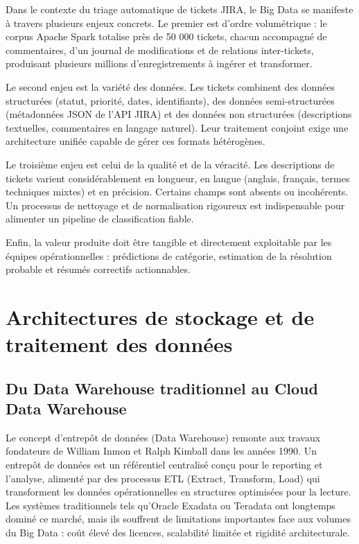 Dans le contexte du triage automatique de tickets JIRA, le Big Data se manifeste à travers plusieurs enjeux concrets. Le premier est d'ordre volumétrique : le corpus Apache Spark totalise près de 50 000 tickets, chacun accompagné de commentaires, d'un journal de modifications et de relations inter-tickets, produisant plusieurs millions d'enregistrements à ingérer et transformer.

Le second enjeu est la variété des données. Les tickets combinent des données structurées (statut, priorité, dates, identifiants), des données semi-structurées (métadonnées JSON de l'API JIRA) et des données non structurées (descriptions textuelles, commentaires en langage naturel). Leur traitement conjoint exige une architecture unifiée capable de gérer ces formats hétérogènes.

Le troisième enjeu est celui de la qualité et de la véracité. Les descriptions de tickets varient considérablement en longueur, en langue (anglais, français, termes techniques mixtes) et en précision. Certains champs sont absents ou incohérents. Un processus de nettoyage et de normalisation rigoureux est indispensable pour alimenter un pipeline de classification fiable.

Enfin, la valeur produite doit être tangible et directement exploitable par les équipes opérationnelles : prédictions de catégorie, estimation de la résolution probable et résumés correctifs actionnables.

\section{Architectures de stockage et de traitement des données}

\subsection{Du Data Warehouse traditionnel au Cloud Data Warehouse}

Le concept d'entrepôt de données (Data Warehouse) remonte aux travaux fondateurs de William Inmon \cite{logo:inmon} et Ralph Kimball \cite{logo:kimball} dans les années 1990. Un entrepôt de données est un référentiel centralisé conçu pour le reporting et l'analyse, alimenté par des processus ETL (Extract, Transform, Load) qui transforment les données opérationnelles en structures optimisées pour la lecture. Les systèmes traditionnels tels qu'Oracle Exadata ou Teradata ont longtemps dominé ce marché, mais ils souffrent de limitations importantes face aux volumes du Big Data : coût élevé des licences, scalabilité limitée et rigidité architecturale.

